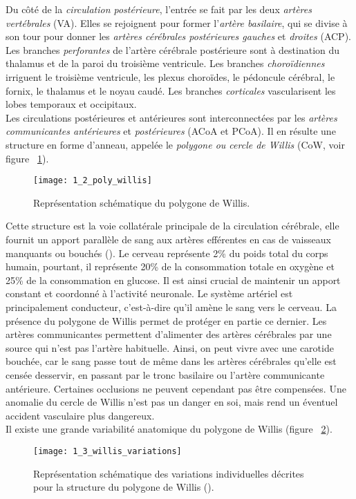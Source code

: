 Du côté de la {\em circulation postérieure}, l’entrée se fait par les deux {\em artères vertébrales} (VA). Elles se rejoignent pour former l’{\em artère basilaire}, qui se divise à son tour pour donner les {\em artères cérébrales postérieures gauches} et {\em droites} (ACP). Les branches {\em perforantes} de l'artère cérébrale postérieure sont à destination du thalamus et de la paroi du troisième ventricule. Les branches {\em choroïdiennes} irriguent le troisième ventricule, les plexus choroïdes, le pédoncule cérébral, le fornix, le thalamus et le noyau caudé. Les branches {\em corticales} vascularisent les lobes temporaux et occipitaux.\\
Les circulations postérieures et antérieures sont interconnectées par les {\em artères communicantes antérieures} et {\em postérieures} (ACoA et PCoA). Il en résulte une structure en forme d’anneau, appelée le {\em polygone ou cercle de Willis} (CoW, voir figure ~\ref{fig:1_2_poly_willis}).
\begin{figure}[!t]
\centering
\texttt{[image: 1\_2\_poly\_willis]}
\caption{Représentation schématique du polygone de Willis. }
\label{fig:1_2_poly_willis}	
\end{figure}
Cette structure est la voie collatérale principale de la circulation cérébrale, elle fournit un apport parallèle de sang aux artères efférentes en cas de vaisseaux manquants ou bouchés (\cite{Alastruey2007}). Le cerveau représente 2\% du poids total du corps humain, pourtant, il représente 20\% de la consommation totale en oxygène et 25\% de la consommation en glucose. Il est ainsi crucial de maintenir un apport constant et coordonné à l’activité neuronale. Le système artériel est principalement conducteur, c’est-à-dire qu’il amène le sang vers le cerveau. La présence du polygone de Willis permet de protéger en partie ce dernier. Les artères communicantes permettent d'alimenter des artères cérébrales par une source qui n'est pas l'artère habituelle. Ainsi, on peut vivre avec une carotide bouchée, car le sang passe tout de même dans les artères cérébrales qu'elle est censée desservir, en passant par le tronc basilaire ou l'artère communicante antérieure. Certaines occlusions ne peuvent cependant pas être compensées. Une anomalie du cercle de Willis n'est pas un danger en soi, mais rend un éventuel accident vasculaire plus dangereux.\\
Il existe une grande variabilité anatomique du polygone de Willis (figure ~\ref{fig:1_3_willis_variations}). 
\begin{figure}[!t]
\centering
\texttt{[image: 1\_3\_willis\_variations]}
\caption{Représentation schématique des variations individuelles décrites pour la structure du polygone de Willis (\cite{LippertPabst1985}). }
\label{fig:1_3_willis_variations}	
\end{figure}

